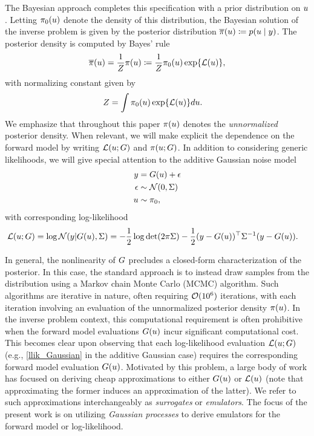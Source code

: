 \documentclass[12pt]{article}
\begin{document}
The Bayesian approach completes this specification with a prior distribution 
on $u$. Letting $\pi_0(u)$ denote the density of this distribution, the Bayesian solution of the inverse problem is given 
by the posterior distribution $\overline{\pi}(u) \coloneqq p(u \mid y)$. The posterior density is computed by Bayes' rule 
\begin{align}
\overline{\pi}(u) = \frac{1}{Z}\pi(u) \coloneqq \frac{1}{Z} \pi_0(u) \exp\mathopen{}\left\{\mathcal{L}(u)\right\}\mathclose{}, \label{post_dens}
\end{align}
with normalizing constant given by 
\begin{align}
Z &= \int \pi_0(u) \exp\mathopen{}\left\{\mathcal{L}(u)\right\}\mathclose{} du. \label{norm_cst}
\end{align}
We emphasize that throughout this paper $\pi(u)$ denotes the \textit{unnormalized} 
posterior density. When relevant, we will make explicit the dependence on the forward 
model by writing $\mathcal{L}(u; G)$ and $\pi(u; G)$. In addition to considering 
generic likelihoods, we will give special attention to the additive Gaussian noise model
\begin{align}
y &= G(u) + \epsilon \label{inv_prob_Gaussian} \\
\epsilon &\sim \mathcal{N}(0, \Sigma) \nonumber \\
u &\sim \pi_0 \nonumber, 
\end{align}
with corresponding log-likelihood 
\begin{align}
\mathcal{L}(u; G) &= \log\mathcal{N}(y| G(u), \Sigma) 
= -\frac{1}{2} \log\det (2\pi \Sigma) - \frac{1}{2} (y - G(u))^\top \Sigma^{-1} (y - G(u)). \label{llik_Gaussian}
\end{align}

In general, the nonlinearity of $G$ precludes a closed-form characterization of the posterior. In this case, the 
standard approach is to instead draw samples from the distribution using a Markov chain Monte Carlo (MCMC) 
algorithm. Such algorithms are iterative in nature, often requiring $\mathcal{O}(10^6)$ iterations, with each 
iteration involving an evaluation of the unnormalized posterior density $\pi(u)$. In the inverse problem 
context, this computational requirement is often prohibitive when the forward model evaluations $G(u)$
incur significant computational cost. This becomes clear upon observing that each log-likelihood evaluation 
$\mathcal{L}(u; G)$ (e.g., \ref{llik_Gaussian} in the additive Gaussian case) requires the corresponding forward 
model evaluation $G(u)$. Motivated by this problem, a large body of work has focused on deriving 
cheap approximations to either $G(u)$ or $\mathcal{L}(u)$ (note that approximating the former induces 
an approximation of the latter). We refer to such approximations interchangeably 
as \textit{surrogates} or \textit{emulators}. The focus of the present work is on utilizing \textit{Gaussian processes} 
to derive emulators for the forward model or log-likelihood. 
\end{document}
